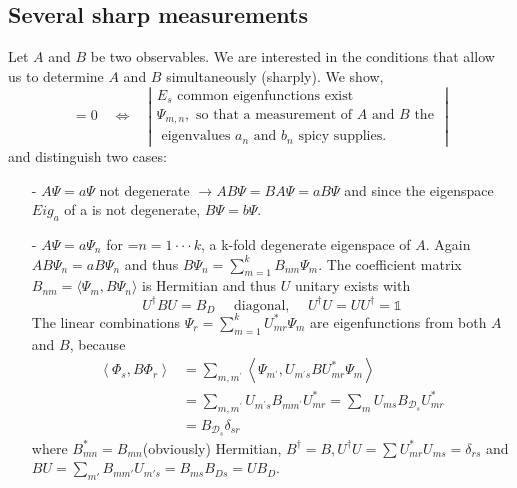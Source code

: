 \subsection{Several sharp measurements}
Let $A$ and $B$ be two observables. We are interested in the conditions that allow us to determine $A$ and $B$ simultaneously (sharply). We show,
\begin{equation}
[A, B]=0 \quad \Longleftrightarrow \quad | \begin{array}{l}{E_s\text { common eigenfunctions exist }} \\ {\Psi_{m, n}, \text { so that a measurement of } A \text { and } B \text { the }} \\ {\text { eigenvalues } a_{n} \text { and } b_{n} \text { spicy supplies. }}\end{array} |
\end{equation}
and distinguish two cases:
\begin{itemize}
    \item[-] $A\Psi=a\Psi$ not degenerate $\to AB\Psi=BA\Psi=aB\Psi$ and since the eigenspace $Eig_a$ of a is not degenerate, $B\Psi=b\Psi$.
    \item[-] $A\Psi=a\Psi_n$ for =$n = 1 · · · k$, a k-fold degenerate eigenspace of $A$.
    Again $AB\Psi_n=aB\Psi_n$ and thus $B\Psi_n=\sum^k_{m=1}B_{nm}\Psi_{m}$. The coefficient matrix $B_{nm}=\langle \Psi_m,B\Psi_n\rangle$ is Hermitian and thus $U$ unitary exists with
    \begin{equation}
        U^{\dagger} B U=B_{D} \quad \text { diagonal, } \quad U^{\dagger} U=U U^{\dagger}=\mathbb{1}
        \end{equation}
    The linear combinations $\Psi_r=\sum^k_{m=1}U^*_{mr}\Psi_m$ are eigenfunctions
    from both $A$ and $B$, because
    \begin{equation}
    \begin{aligned}\left\langle\Phi_{s}, B \Phi_{r}\right\rangle &=\sum_{m, m^{\prime}}\left\langle\Psi_{m^{\prime}}, U_{m^{\prime} s} B U_{m r}^{*} \Psi_{m}\right\rangle \\ &=\sum_{m, m^{\prime}} U_{m^{\prime} s} B_{m m^{\prime}} U_{m r}^{*}=\sum_{m} U_{m s} B_{\mathcal{D}_{s}} U_{m r}^{*} \\ &=B_{\mathcal{D}_{s}} \delta_{s r} \end{aligned}
    \end{equation}
    where $B^*_{mn}=B_{mn}$(obviously) Hermitian, $B^{\dagger}=B, U^{\dagger}U=\sum U^*_{mr}U_{ms}=\delta_{rs}$ and $BU=\sum_{m'}B_{mm'}U_{m's}=B_{ms}B_{Ds}=UB_D$.
\end{itemize}
